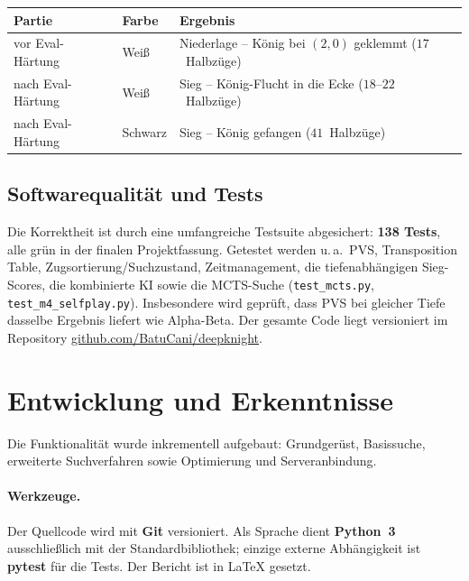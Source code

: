 \documentclass[11pt,a4paper]{article}
\newcommand{\code}[1]{\texttt{\small #1}}
\begin{document}
\begin{center}
\begin{minipage}{\linewidth}
\centering
{}
\begin{tabular}{ll>{\raggedright\arraybackslash}p{5.6cm}}
\toprule
\textbf{Partie} & \textbf{Farbe} & \textbf{Ergebnis} \\
\midrule
vor Eval-H\"artung  & Wei\ss   & Niederlage -- K\"onig bei $(2,0)$ geklemmt ($17$~Halbz\"uge) \\
nach Eval-H\"artung & Wei\ss   & Sieg -- K\"onig-Flucht in die Ecke ($18$--$22$~Halbz\"uge) \\
nach Eval-H\"artung & Schwarz  & Sieg -- K\"onig gefangen ($41$~Halbz\"uge) \\
\bottomrule
\end{tabular}
\end{minipage}
\end{center}

\subsection{Softwarequalit\"at und Tests}
Die Korrektheit ist durch eine umfangreiche Testsuite abgesichert:
\textbf{138 Tests}, alle gr\"un in der finalen Projektfassung.
Getestet werden u.\,a.\ PVS, Transposition Table, Zugsortierung/Suchzustand,
Zeitmanagement, die tiefenabh\"angigen Sieg-Scores, die kombinierte KI sowie die
MCTS-Suche (\code{test\_mcts.py}, \code{test\_m4\_selfplay.py}).
Insbesondere wird gepr\"uft, dass PVS bei gleicher Tiefe dasselbe Ergebnis
liefert wie Alpha-Beta.
Der gesamte Code liegt versioniert im Repository
\href{https://github.com/BatuCani/deepknight}{github.com/BatuCani/deepknight}.

\section{Entwicklung und Erkenntnisse}\label{sec:process}
Die Funktionalit\"at wurde inkrementell aufgebaut: Grundger\"ust,
Basissuche, erweiterte Suchverfahren sowie Optimierung und Serveranbindung.

\paragraph{Werkzeuge.}
Der Quellcode wird mit \textbf{Git} versioniert.
Als Sprache dient \textbf{Python~3} ausschlie\ss lich mit der Standardbibliothek;
einzige externe Abh\"angigkeit ist \textbf{pytest} f\"ur die Tests.
Der Bericht ist in \LaTeX{} gesetzt.
\end{document}
